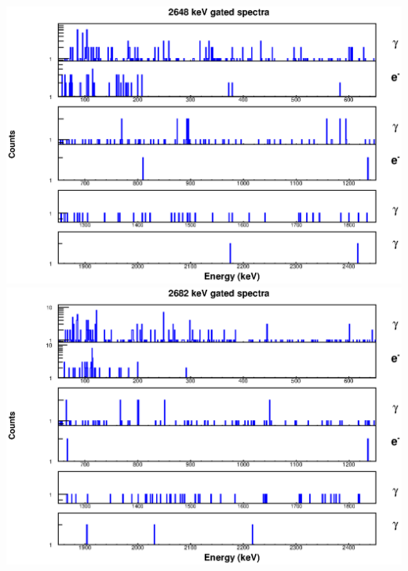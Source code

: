 \includegraphics[scale=0.8]{154Gd_Appendix/2648_combined.eps}
\includegraphics[scale=0.8]{154Gd_Appendix/2682_combined.eps}
